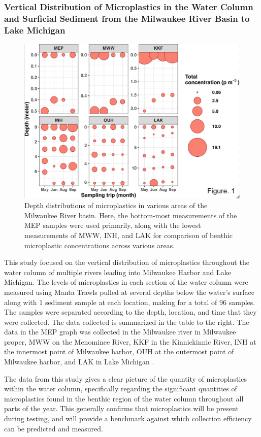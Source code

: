 \documentclass[fleqn,10pt]{SelfArx} %
\begin{document}
	\subsubsection*{Vertical Distribution of Microplastics in the Water Column and Surficial Sediment from the Milwaukee River Basin to Lake Michigan}
	\begin{figure}[H]
		\centering
		\includegraphics[width=0.8\linewidth]{Figures/DepthDistribution.png}
		\caption[Vertical MP Distribution]{Depth distributions of microplastics in various areas of the Milwaukee River basin. Here, the bottom-most measurements of the MEP samples were used primarily, along with the lowest measurements of MWW, INH, and LAK for comparison of \gls{benthic} microplastic concentrations across various areas.}
		\label{fig:VerticalDepthDist}
	\end{figure}
	This study focused on the vertical distribution of microplastics throughout the water column of multiple rivers leading into Milwaukee Harbor and Lake Michigan. The levels of microplastics in each section of the water column were measured using Manta Trawls pulled at several depths below the water’s surface along with 1 sediment sample at each location, making for a total of 96 samples. The samples were separated according to the depth, location, and time that they were collected. The data collected is summarized in the table to the right. The data in the MEP graph was collected in the Milwaukee river in Milwaukee proper, MWW on the Menominee River, KKF in the Kinnickinnic River, INH at the innermost point of Milwaukee harbor, OUH at the outermost point of Milwaukee harbor, and LAK in Lake Michigan \cite{LenakerEtAlvertdist}.
	
	The data from this study gives a clear picture of the quantity of microplastics within the water column, specifically regarding the significant quantities of microplastics found in the \gls{benthic} region of the water column throughout all parts of the year. This generally confirms that microplastics will be present during testing, and will provide a benchmark against which collection efficiency can be predicted and measured.
	
\end{document}
